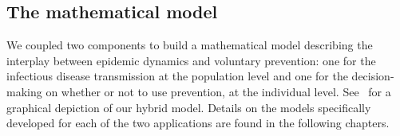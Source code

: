 %


\subsection{The mathematical model}
\label{Intro:Model} 

We coupled two components to build a mathematical model describing the interplay between epidemic dynamics and voluntary prevention: one for the infectious disease transmission at the population level and one for the decision-making on whether or not to use prevention, at the individual level. See~ for a graphical depiction of our hybrid model. Details on the models specifically developed for each of the two applications are found in the following chapters. 

